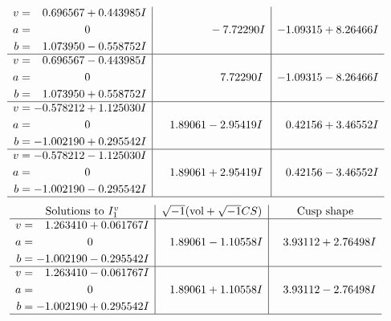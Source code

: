 \documentclass[1p]{elsarticle_modified}
\theoremstyle{definition}
\newcommand{\I}{\sqrt{-1}}
\begin{document}
$$\begin{array}{c|c|c}
\begin{aligned}
v &= \phantom{-}0.696567 + 0.443985 I \\
a &= \phantom{-0.000000 } 0 \\
b &= \phantom{-}1.073950 - 0.558752 I\end{aligned}
 & \phantom{-0.000000 } -7.72290 I & -1.09315 + 8.26466 I \\ \hline\begin{aligned}
v &= \phantom{-}0.696567 - 0.443985 I \\
a &= \phantom{-0.000000 } 0 \\
b &= \phantom{-}1.073950 + 0.558752 I\end{aligned}
 & \phantom{-0.000000 -}7.72290 I & -1.09315 - 8.26466 I \\ \hline\begin{aligned}
v &= -0.578212 + 1.125030 I \\
a &= \phantom{-0.000000 } 0 \\
b &= -1.002190 + 0.295542 I\end{aligned}
 & \phantom{-}1.89061 - 2.95419 I & \phantom{-}0.42156 + 3.46552 I \\ \hline\begin{aligned}
v &= -0.578212 - 1.125030 I \\
a &= \phantom{-0.000000 } 0 \\
b &= -1.002190 - 0.295542 I\end{aligned}
 & \phantom{-}1.89061 + 2.95419 I & \phantom{-}0.42156 - 3.46552 I\\
 \hline 
 \end{array}$$\newpage$$\begin{array}{c|c|c}  
\text{Solutions to }I^v_{1}& \I (\text{vol} + \sqrt{-1}CS) & \text{Cusp shape}\\
 \hline 
\begin{aligned}
v &= \phantom{-}1.263410 + 0.061767 I \\
a &= \phantom{-0.000000 } 0 \\
b &= -1.002190 - 0.295542 I\end{aligned}
 & \phantom{-}1.89061 - 1.10558 I & \phantom{-}3.93112 + 2.76498 I \\ \hline\begin{aligned}
v &= \phantom{-}1.263410 - 0.061767 I \\
a &= \phantom{-0.000000 } 0 \\
b &= -1.002190 + 0.295542 I\end{aligned}
 & \phantom{-}1.89061 + 1.10558 I & \phantom{-}3.93112 - 2.76498 I\\
 \hline 
 \end{array}$$\newpage
\end{document}
